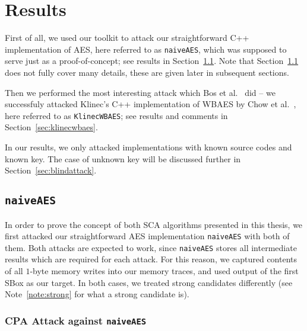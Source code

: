 \section{Results}
\label{sec:results}

First of all, we used our toolkit to attack our straightforward C++ implementation of AES, here referred to as {\tt naiveAES}, which was supposed to serve just as a proof-of-concept; see results in Section~\ref{sec:naiveaes}. Note that Section~\ref{sec:naiveaes} does not fully cover many details, these are given later in subsequent sections.

Then we performed the most interesting attack which Bos et al.\ \cite{bos2015differential} did -- we successfuly attacked Klinec's C++ implementation \cite{klinec2013implementation} of WBAES by Chow et al.\ \cite{chow2002aes}, here referred to as {\tt KlinecWBAES}; see results and comments in Section~\ref{sec:klinecwbaes}.

\begin{note}
\label{note:expdes}
	In our results, we only attacked implementations with known source codes and known key. The case of unknown key will be discussed further in Section~\ref{sec:blindattack}.
\end{note}



\subsection{\tt naiveAES}
\label{sec:naiveaes}

In order to prove the concept of both SCA algorithms presented in this thesis, we first attacked our straightforward AES implementation {\tt naiveAES} with both of them. Both attacks are expected to work, since {\tt naiveAES} stores all intermediate results which are required for each attack. For this reason, we captured contents of all $1$-byte memory writes into our memory traces, and used output of the first SBox as our target. In both cases, we treated strong candidates differently (see Note~\ref{note:strong} for what a strong candidate is).

\subsubsection{CPA Attack against {\tt naiveAES}}
	
